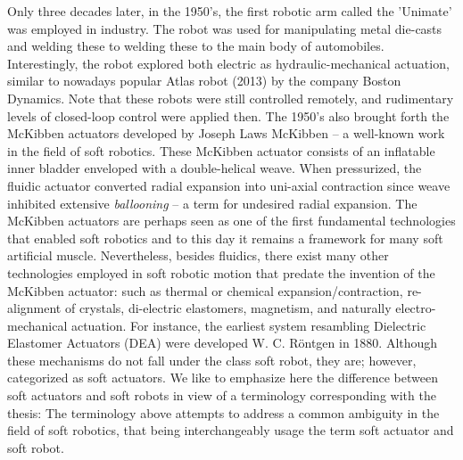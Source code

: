 Only three decades later, in the 1950's, the first robotic arm called the 'Unimate' was employed in industry. The robot was used for manipulating metal die-casts and welding these to welding these to the main body of automobiles. Interestingly, the robot explored both electric as hydraulic-mechanical actuation, similar to nowadays popular Atlas robot (2013) by the company Boston Dynamics. Note that these robots were still controlled remotely, and rudimentary levels of closed-loop control were applied then. The 1950's also brought forth the McKibben actuators developed by Joseph Laws McKibben -- a well-known work in the field of soft robotics. These McKibben actuator consists of an inflatable inner bladder enveloped with a double-helical weave. When pressurized, the fluidic actuator converted radial expansion into uni-axial contraction since weave inhibited extensive \emph{ballooning} -- a term for undesired radial expansion. The McKibben actuators are perhaps seen as one of the first fundamental technologies that enabled soft robotics and to this day it remains a framework for many soft artificial muscle. Nevertheless, besides fluidics, there exist many other technologies employed in soft robotic motion that predate the invention of the McKibben actuator: such as thermal or chemical expansion/contraction, re-alignment of crystals, di-electric elastomers, magnetism, and naturally electro-mechanical actuation. For instance, the earliest system resambling Dielectric Elastomer Actuators (DEA) were developed W. C. R\"{o}ntgen in 1880. Although these mechanisms do not fall under the class soft robot, they are; however, categorized as soft actuators. We like to emphasize here the difference between soft actuators and soft robots in view of a terminology corresponding with the thesis:
%
%
\noindent The terminology above attempts to address a common ambiguity in the field of soft robotics, that being interchangeably usage the term soft actuator and soft robot.

